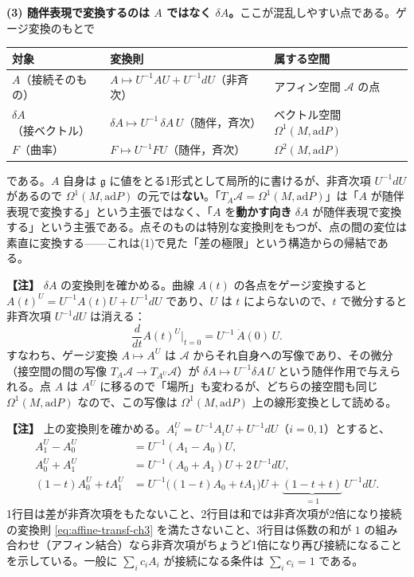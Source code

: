 \documentclass[uplatex, dvipdfmx, book]{jsbook}
\newenvironment{note}{\vspace{1ex}\par\footnotesize\noindent\textbf{【注】}}{\par\vspace{1ex}}
\begin{document}
\textbf{(3) 随伴表現で変換するのは $A$ ではなく $\delta A$。}ここが混乱しやすい点である。ゲージ変換のもとで
\begin{center}
\begin{tabular}{l|l|l}
    対象 & 変換則 & 属する空間 \\ \hline
    $A$（接続そのもの） & $A \mapsto U^{-1}AU + U^{-1}dU$（非斉次） & アフィン空間 $\mathcal{A}$ の点 \\
    $\delta A$（接ベクトル） & $\delta A \mapsto U^{-1}\,\delta A\, U$（随伴，斉次） & ベクトル空間 $\Omega^1(M,\mathrm{ad}P)$ \\
    $F$（曲率） & $F \mapsto U^{-1}FU$（随伴，斉次） & $\Omega^2(M,\mathrm{ad}P)$
\end{tabular}
\end{center}
である。$A$ 自身は $\mathfrak{g}$ に値をとる1形式として局所的に書けるが、非斉次項 $U^{-1}dU$ があるので $\Omega^1(M,\mathrm{ad}P)$ の元では\textbf{ない}。「$T_A\mathcal{A} = \Omega^1(M,\mathrm{ad}P)$」は「$A$ が随伴表現で変換する」という主張ではなく、「$A$ を\textbf{動かす向き} $\delta A$ が随伴表現で変換する」という主張である。点そのものは特別な変換則をもつが、点の間の変位は素直に変換する——これは(1)で見た「差の極限」という構造からの帰結である。

\begin{note}
$\delta A$ の変換則を確かめる。曲線 $A(t)$ の各点をゲージ変換すると $A(t)^U = U^{-1}A(t)U + U^{-1}dU$ であり、$U$ は $t$ によらないので、$t$ で微分すると非斉次項 $U^{-1}dU$ は消える：
\begin{equation*}
    \frac{d}{dt}A(t)^U\Big|_{t=0} = U^{-1}\,\dot A(0)\,U .
\end{equation*}
すなわち、ゲージ変換 $A \mapsto A^U$ は $\mathcal{A}$ からそれ自身への写像であり、その微分（接空間の間の写像 $T_A\mathcal{A} \to T_{A^U}\mathcal{A}$）が $\delta A \mapsto U^{-1}\delta A\,U$ という随伴作用で与えられる。点 $A$ は $A^U$ に移るので「場所」も変わるが、どちらの接空間も同じ $\Omega^1(M,\mathrm{ad}P)$ なので、この写像は $\Omega^1(M,\mathrm{ad}P)$ 上の線形変換として読める。
\end{note}


\begin{note}
上の変換則を確かめる。$A_i^U = U^{-1}A_iU + U^{-1}dU$（$i=0,1$）とすると、
\begin{align*}
    A_1^U - A_0^U &= U^{-1}(A_1 - A_0)U, \\
    A_0^U + A_1^U &= U^{-1}(A_0 + A_1)U + 2\,U^{-1}dU, \\
    (1-t)A_0^U + tA_1^U &= U^{-1}\bigl((1-t)A_0 + tA_1\bigr)U + \underbrace{(1-t+t)}_{=1}\,U^{-1}dU .
\end{align*}
1行目は差が非斉次項をもたないこと、2行目は和では非斉次項が2倍になり接続の変換則 \eqref{eq:affine-transf-ch3} を満たさないこと、3行目は係数の和が $1$ の組み合わせ（アフィン結合）なら非斉次項がちょうど1倍になり再び接続になることを示している。一般に $\sum_i c_iA_i$ が接続になる条件は $\sum_i c_i = 1$ である。
\end{note}
\end{document}
